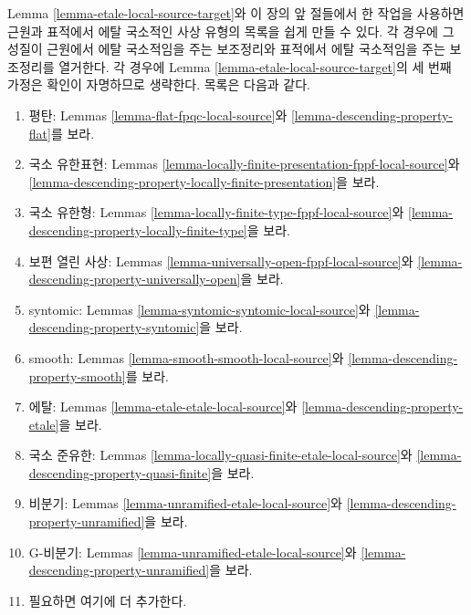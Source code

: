 \begin{remark}
\label{remark-list-local-source-target}
Lemma \ref{lemma-etale-local-source-target}와 이 장의 앞 절들에서 한
작업을 사용하면 근원과 표적에서 에탈 국소적인 사상 유형의 목록을
쉽게 만들 수 있다. 각 경우에 그 성질이 근원에서 에탈 국소적임을
주는 보조정리와 표적에서 에탈 국소적임을 주는 보조정리를 열거한다.
각 경우에 Lemma \ref{lemma-etale-local-source-target}의 세 번째 가정은
확인이 자명하므로 생략한다. 목록은 다음과 같다.
\begin{enumerate}
\item 평탄: Lemmas \ref{lemma-flat-fpqc-local-source}와
\ref{lemma-descending-property-flat}를 보라.
\item 국소 유한표현: Lemmas
\ref{lemma-locally-finite-presentation-fppf-local-source}와
\ref{lemma-descending-property-locally-finite-presentation}을 보라.
\item 국소 유한형: Lemmas \ref{lemma-locally-finite-type-fppf-local-source}와
\ref{lemma-descending-property-locally-finite-type}을 보라.
\item 보편 열린 사상: Lemmas \ref{lemma-universally-open-fppf-local-source}와
\ref{lemma-descending-property-universally-open}을 보라.
\item syntomic: Lemmas \ref{lemma-syntomic-syntomic-local-source}와
\ref{lemma-descending-property-syntomic}을 보라.
\item smooth: Lemmas \ref{lemma-smooth-smooth-local-source}와
\ref{lemma-descending-property-smooth}를 보라.
\item 에탈: Lemmas \ref{lemma-etale-etale-local-source}와
\ref{lemma-descending-property-etale}을 보라.
\item 국소 준유한: Lemmas \ref{lemma-locally-quasi-finite-etale-local-source}와
\ref{lemma-descending-property-quasi-finite}을 보라.
\item 비분기: Lemmas \ref{lemma-unramified-etale-local-source}와
\ref{lemma-descending-property-unramified}을 보라.
\item G-비분기: Lemmas \ref{lemma-unramified-etale-local-source}와
\ref{lemma-descending-property-unramified}을 보라.
\item 필요하면 여기에 더 추가한다.
\end{enumerate}
\end{remark}

